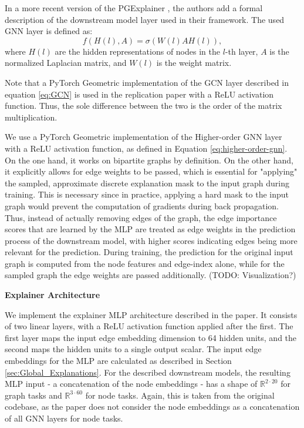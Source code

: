 In a more recent version of the PGExplainer \cite{10423141}, the authors add a formal description of the downstream model layer used in their framework. The used GNN layer is defined as:
\begin{equation}
    f(H(l),A)=\sigma(W(l)AH(l)),
\end{equation}
where $H(l)$ are the hidden representations of nodes in the $l$-th layer, $A$ is the normalized Laplacian matrix, and $W(l)$ is the weight matrix.

Note that a PyTorch Geometric implementation of the GCN layer described in equation \ref{eq:GCN} is used in the replication paper \cite{holdijk2021re} with a ReLU activation function. Thus, the sole difference between the two is the order of the matrix multiplication. \bigskip

We use a PyTorch Geometric implementation of the Higher-order GNN layer with a ReLU activation function, as defined in Equation \ref{eq:higher-order-gnn}. On the one hand, it works on bipartite graphs by definition. On the other hand, it explicitly allows for edge weights to be passed, which is essential for "applying" the sampled, approximate discrete explanation mask to the input graph during training. This is necessary since in practice, applying a hard mask to the input graph would prevent the computation of gradients during back propagation. Thus, instead of actually removing edges of the graph, the edge importance scores that are learned by the MLP are treated as edge weights in the prediction process of the downstream model, with higher scores indicating edges being more relevant for the prediction. During training, the prediction for the original input graph is computed from the node features and edge-index alone, while for the sampled graph the edge weights are passed additionally. (TODO: Visualization?)\bigskip

\textbf{Explainer Architecture}\par
We implement the explainer MLP architecture described in the paper. It consists of two linear layers, with a ReLU activation function applied after the first. The first layer maps the input edge embedding dimension to 64 hidden units, and the second maps the hidden units to a single output scalar. The input edge embeddings for the MLP are calculated as described in Section \ref{sec:Global_Explanations}. For the described downstream models, the resulting MLP input - a concatenation of the node embeddings - has a shape of $\mathbb{R}^{2\cdot20}$ for graph tasks and $\mathbb{R}^{3\cdot60}$ for node tasks. Again, this is taken from the original codebase, as the paper does not consider the node embeddings as a concatenation of all GNN layers for node tasks.

